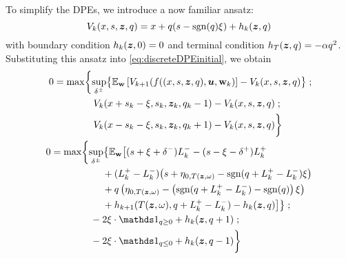 To simplify the DPEs, we introduce a now familiar ansatz:
\begin{equation}
\label{eq:ansatzHdscr}
V_k (x,s,\bm{z},q) = x + q(s-\operatorname{\mathrm{sgn}}(q)\xi) + h_k(\bm{z},q)
\end{equation}
with boundary condition $h_k(\bm{z},0) = 0$ and terminal condition $h_T(\bm{z},q) = -\alpha q^2$. Substituting this ansatz into \eqref{eq:discreteDPEinitial}, we obtain
\begin{align}
\begin{split}
0 & = \max \biggl\lbrace \sup_{\delta^\pm} \bigl\lbrace \E_{\bw} \left[ V_{k+1} (f((x,s,\bz,q),\bu,\bw_k) \right] - V_k (x,s,\bz,q) \bigr\rbrace \; ; \\
& \hphantom{{}={} \max \biggl\lbrace} V_k(x+s_k-\xi,s_k, \bz_k, q_k -1) - V_k (x,s,\bz,q)\; ; \\
& \hphantom{{}={} \max \biggl\lbrace} V_k(x-s_k-\xi,s_k, \bz_k, q_k +1) - V_k (x,s,\bz,q) \biggr\rbrace
\end{split} \\
\label{eq:discreteDPE}
\begin{split}
0 & = \max \biggl\lbrace 
\sup_{\delta^\pm} \bigl\lbrace \E_{\bw} \bigl[
(s + \xi + \delta^-)L_k^- - (s - \xi - \delta^+)L_k^+ \\
& \hphantom{\sup_{\bu} \biggl\lbrace \E_{\bw} \biggl[ {}+{}} + (L_k^+ - L_k^-) \bigl( s + \eta_{0,T(\bz, \omega)}  -\sgn( q + L_k^+ - L_k^-)\xi   \bigr) \\
& \hphantom{\sup_{\bu} \biggl\lbrace \E_{\bw} \biggl[ {}+{}} + q\left( \eta_{0,T(\bz, \omega)}  -\left( \sgn( q + L_k^+ - L_k^-) - \sgn(q) \right) \xi \right) \\
& \hphantom{\sup_{\bu} \biggl\lbrace \E_{\bw} \biggl[ {}+{}} + h_{k+1}(T(\bz,\omega), q + L_k^+ - L_k^- ) -  h_k(\bz,q) \bigr] \bigr\rbrace \; ;\\
& \hphantom{{}={} \max \biggl\lbrace } -2\xi \cdot \indicator_{q \geq 0} + h_k(\bz,q+1) \; ; \\
& \hphantom{{}={} \max \biggl\lbrace } -2\xi \cdot \indicator_{q \leq 0} + h_k(\bz,q-1) \biggr\rbrace
\end{split}
\end{align}

